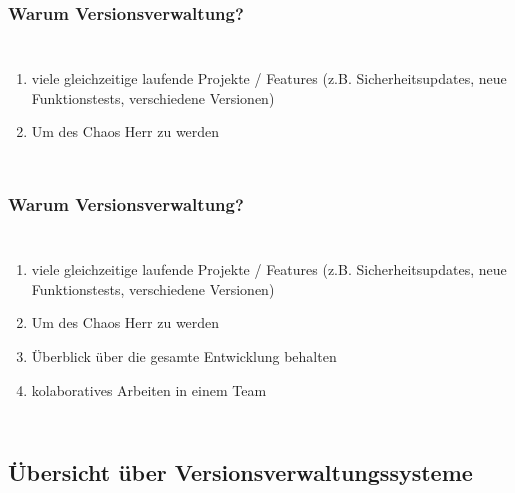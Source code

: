 \documentclass{beamer}
\begin{document}
\begin{frame}\frametitle{Warum Versionsverwaltung?}
\begin{columns}
                \begin{enumerate}
                \item viele gleichzeitige laufende Projekte / Features (z.B. Sicherheitsupdates, neue Funktionstests, verschiedene Versionen)
                \item Um des Chaos Herr zu werden
                \end{enumerate}
\end{columns}
\end{frame}

\begin{frame}\frametitle{Warum Versionsverwaltung?}
\begin{columns}
                \begin{enumerate}
                \item viele gleichzeitige laufende Projekte / Features (z.B. Sicherheitsupdates, neue  Funktionstests, verschiedene Versionen)
                \item Um des Chaos Herr zu werden
                \item Überblick über die gesamte Entwicklung behalten
                \item kolaboratives Arbeiten in einem Team
                \end{enumerate}
\end{columns}
\end{frame}

\subsection{Übersicht über Versionsverwaltungssysteme}
\end{document}
